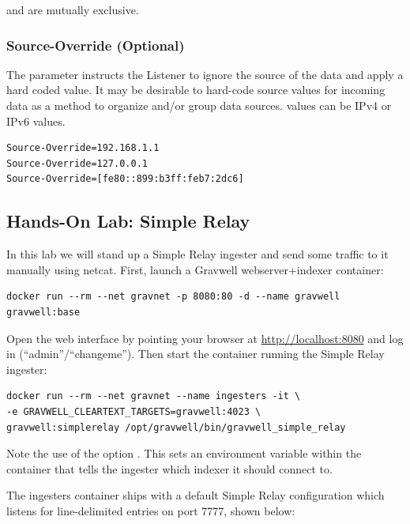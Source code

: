  and  are mutually
exclusive.

\subsubsection*{Source-Override (Optional)}

The  parameter instructs the Listener to ignore the
source of the data and apply a hard coded value. It may be desirable to
hard-code source values for incoming data as a method to organize and/or
group data sources.  values can be IPv4 or IPv6
values.

\begin{Verbatim}[breaklines=true]
Source-Override=192.168.1.1
Source-Override=127.0.0.1
Source-Override=[fe80::899:b3ff:feb7:2dc6]
\end{Verbatim}

\subsection{Hands-On Lab: Simple Relay}

In this lab we will stand up a Simple Relay ingester and send some
traffic to it manually using netcat. First, launch a Gravwell
webserver+indexer container:

\begin{Verbatim}[breaklines=true]
docker run --rm --net gravnet -p 8080:80 -d --name gravwell gravwell:base
\end{Verbatim}

Open the web interface by pointing your browser at \href{http://localhost:8080/}{http://localhost:8080} and log in (``admin''/``changeme''). Then start the container running the Simple Relay ingester:

\begin{Verbatim}[breaklines=true]
docker run --rm --net gravnet --name ingesters -it \
-e GRAVWELL_CLEARTEXT_TARGETS=gravwell:4023 \
gravwell:simplerelay /opt/gravwell/bin/gravwell_simple_relay
\end{Verbatim}

Note the use of the option .
This sets an environment
variable within the container that tells the ingester which indexer it
should connect to.

The ingesters container ships with a default Simple Relay configuration
which listens for line-delimited entries on port 7777, shown below:

